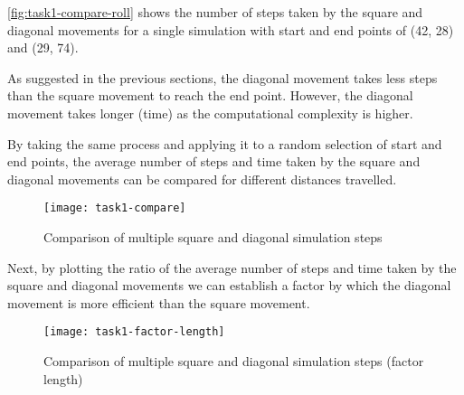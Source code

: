 \autoref{fig:task1-compare-roll} shows the number of steps taken by the square and diagonal movements for a single simulation with start and end points of (42, 28) and (29, 74).


As suggested in the previous sections, the diagonal movement takes less steps than the square movement to reach the end point.
However, the diagonal movement takes longer (time) as the computational complexity is higher.



\clearpage

By taking the same process and applying it to a random selection of start and end points, 
the average number of steps and time taken by the square and diagonal movements can be compared for different distances travelled.



\begin{figure}[ht]
    \centering
    \texttt{[image: task1-compare]}
    \caption[Comparison of multiple square and diagonal simulation steps]{Comparison of multiple square and diagonal simulation steps}
    \label{fig:task1-compare}
\end{figure}

Next, by plotting the ratio of the average number of steps and time taken by the square and diagonal movements
we can establish a factor by which the diagonal movement is more efficient than the square movement.

\begin{figure}[ht]
    \centering
    \texttt{[image: task1-factor-length]}
    \caption[Comparison of multiple square and diagonal simulation steps (factor length)]{Comparison of multiple square and diagonal simulation steps (factor length)}
    \label{fig:task1-factor-length}
\end{figure}

